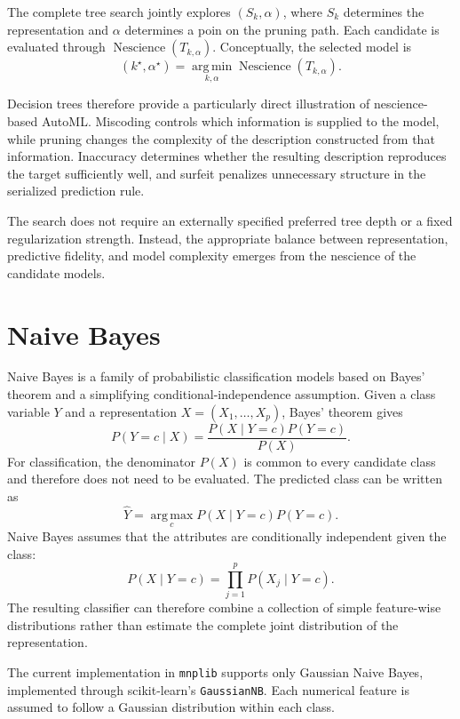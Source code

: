 The complete tree search jointly explores $(S_k,\alpha)$, where $S_k$ determines the representation and $\alpha$ determines a poin on the pruning path. Each candidate is evaluated through $\operatorname{Nescience}(T_{k,\alpha})$. Conceptually, the selected model is
\[
(k^\star,\alpha^\star) =
\operatorname*{arg\,min}_{k,\alpha} \operatorname{Nescience}(T_{k,\alpha}).
\]

Decision trees therefore provide a particularly direct illustration of nescience-based AutoML. Miscoding controls which information is supplied to the model, while pruning changes the complexity of the description constructed from that information. Inaccuracy determines whether the resulting description reproduces the target sufficiently well, and surfeit penalizes unnecessary structure in the serialized prediction rule.

The search does not require an externally specified preferred tree depth or a fixed regularization strength. Instead, the appropriate balance between representation, predictive fidelity, and model complexity emerges from the nescience of the candidate models.

%
%

\section{Naive Bayes}
\label{subsec:automl_naive_bayes}

Naive Bayes is a family of probabilistic classification models based on Bayes' theorem and a simplifying conditional-independence assumption. Given a class variable \(Y\) and a representation $X=(X_1,\ldots,X_p)$, Bayes' theorem gives
\[
P(Y=c\mid X) = \frac{P(X\mid Y=c)P(Y=c)}{P(X)}.
\]
For classification, the denominator \(P(X)\) is common to every candidate class and therefore does not need to be evaluated. The predicted class can be written as
\[
\widehat{Y} = \operatorname*{arg\,max}_{c} P(X\mid Y=c)P(Y=c).
\]
 Naive Bayes assumes that the attributes are conditionally independent given the class:
\[
P(X\mid Y=c) = \prod_{j=1}^{p} P(X_j\mid Y=c).
\]
The resulting classifier can therefore combine a collection of simple feature-wise distributions rather than estimate the complete joint distribution of the representation.

The current implementation in \texttt{mnplib} supports only Gaussian Naive Bayes, implemented through scikit-learn's \texttt{GaussianNB}. Each numerical feature is assumed to follow a Gaussian distribution within each class.

